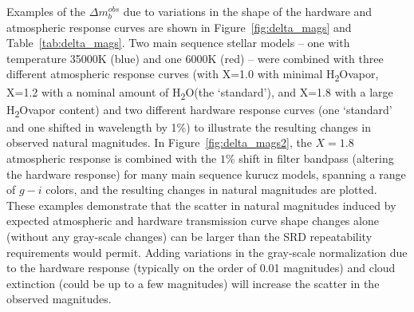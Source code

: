 \documentclass[12pt,preprint]{aastex}
\newcommand{\water}   {H\textsubscript{2}O}
\begin{document}
Examples of the $\Delta m_b^{obs}$ due to variations in the shape of
the hardware and atmospheric response curves are shown in
Figure~\ref{fig:delta_mags} and Table~\ref{tab:delta_mags}. Two main
sequence stellar models \citep{Kurucz1993} -- one with temperature 35000K
(blue) and one 6000K (red) -- were combined with three different
atmospheric response curves (with X=1.0 with minimal \water vapor,
X=1.2 with a nominal amount of \water (the `standard'), and X=1.8 with
a large \water vapor content) and two different hardware response
curves (one `standard' and one shifted in wavelength by 1\%)
to illustrate the resulting changes in observed natural magnitudes. In
Figure~\ref{fig:delta_mags2}, the $X=1.8$ atmospheric response is
combined with the $1\%$ shift in filter bandpass (altering the
hardware response) for many main sequence kurucz models, spanning a
range of $g-i$ colors, and the resulting changes in natural
magnitudes are plotted.  These examples demonstrate that the scatter in
natural magnitudes induced by expected atmospheric and hardware transmission
curve shape changes alone (without any gray-scale changes) can be larger
than the SRD repeatability requirements would permit. Adding variations 
in the gray-scale normalization due to the hardware response (typically on the
order of 0.01 magnitudes) and cloud extinction (could be up to a few magnitudes)
will increase the scatter in the observed magnitudes. 
\end{document}
